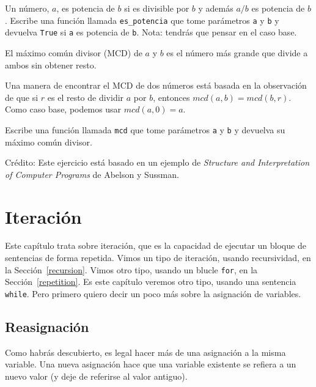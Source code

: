 \documentclass[10pt]{book}
\begin{document}
\begin{exercise}

Un número, $a$, es potencia de $b$ si es divisible por $b$
y además $a/b$ es potencia de $b$.  Escribe una función llamada
\verb"es_potencia" que tome parámetros {\tt a} y {\tt b}
y devuelva {\tt True} si {\tt a} es potencia de {\tt b}.
Nota: tendrás que pensar en el caso base.

\end{exercise}


\begin{exercise}

El máximo común divisor (MCD) de $a$ y $b$ es el número más grande
que divide a ambos sin obtener resto.

Una manera de encontrar el MCD de dos números está basada en la observación
de que si $r$ es el resto de dividir $a$ por $b$, entonces $mcd(a,
b) = mcd(b, r)$.  Como caso base, podemos usar $mcd(a, 0) = a$.

Escribe una función llamada
\verb"mcd" que tome parámetros {\tt a} y {\tt b}
y devuelva su máximo común divisor.

Crédito: Este ejercicio está basado en un ejemplo de
{\em Structure and Interpretation of Computer Programs} de Abelson y Sussman.

\end{exercise}


\chapter{Iteración}

Este capítulo trata sobre iteración, que es la capacidad de ejecutar
un bloque de sentencias de forma repetida.  Vimos un tipo de iteración,
usando recursividad, en la Sección~\ref{recursion}.
Vimos otro tipo, usando un blucle {\tt for},
en la Sección~\ref{repetition}.  Es este capítulo veremos otro
tipo, usando una sentencia {\tt while}.
Pero primero quiero decir un poco más sobre la asignación de variables.


\section{Reasignación}

Como habrás descubierto, es legal hacer más de una
asignación a la misma variable.  Una nueva asignación hace que una variable existente
se refiera a un nuevo valor (y deje de referirse al valor antiguo).
\end{document}
